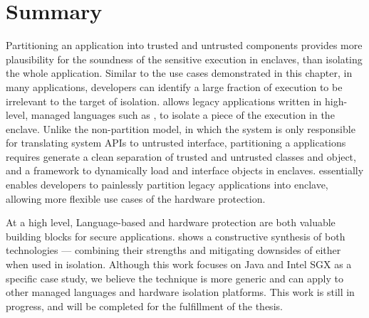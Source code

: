 \section{Summary}
\label{sec:civet:summary}

Partitioning an application into trusted and untrusted components
provides more plausibility for the soundness of the sensitive execution in enclaves,
than isolating the whole application.
Similar to the use cases demonstrated in this chapter,
in many applications,
developers can identify a large fraction of execution to be irrelevant to
the target of isolation.
\sysname{} allows legacy applications written in high-level,
managed languages such as \java{},
to isolate a piece of the execution in the \sgx{} enclave.
Unlike the non-partition model,
in which the system is only responsible for translating system APIs to untrusted interface,
partitioning a \java{} applications requires generate a clean separation
of trusted and untrusted classes and object,
and a framework to dynamically load and interface objects in enclaves.
\sysname{} essentially enables developers to painlessly partition legacy \java{} applications into enclave,
allowing more flexible use cases of the hardware protection.

At a high level,
Language-based and hardware protection are both valuable
building blocks for secure applications.
\sysname{} shows a constructive synthesis of both technologies
--- combining their strengths
and mitigating downsides of either when used in isolation.
Although this work focuses on Java and Intel SGX as a specific case study,
we believe the technique is more generic
and can apply to
other managed languages and hardware isolation platforms.
This work is still in progress, and will be completed for the fulfillment of the thesis.



